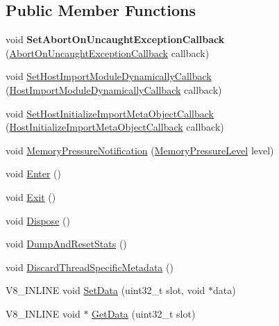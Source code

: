 \subsection*{Public Member Functions}
\begin{DoxyCompactItemize}
\item 
\mbox{\label{classv8_1_1Isolate_afb7aad57eec61464b5a7c3816bae60be}} 
void {\bfseries Set\+Abort\+On\+Uncaught\+Exception\+Callback} (\mbox{\hyperlink{classv8_1_1Isolate_aeb1d49e500d9521b42743a6a740271e2}{Abort\+On\+Uncaught\+Exception\+Callback}} callback)
\item 
void \mbox{\hyperlink{classv8_1_1Isolate_a64a3cec46b3d6a8f437da81ae1a61f84}{Set\+Host\+Import\+Module\+Dynamically\+Callback}} (\mbox{\hyperlink{namespacev8_a327d89ea1fb89b4ada3571a3571413cc}{Host\+Import\+Module\+Dynamically\+Callback}} callback)
\item 
void \mbox{\hyperlink{classv8_1_1Isolate_ad5525cb1e8d0722df9cf1d163204c765}{Set\+Host\+Initialize\+Import\+Meta\+Object\+Callback}} (\mbox{\hyperlink{namespacev8_a46fe0379312fafd495b9be892b2de443}{Host\+Initialize\+Import\+Meta\+Object\+Callback}} callback)
\item 
void \mbox{\hyperlink{classv8_1_1Isolate_ae1b8d5696ba55dd3412989811c44c373}{Memory\+Pressure\+Notification}} (\mbox{\hyperlink{namespacev8_ae0e9a25bf51e518585f555806e7dc7b9}{Memory\+Pressure\+Level}} level)
\item 
void \mbox{\hyperlink{classv8_1_1Isolate_aec80bb49b6b7647ff75e8f2cc9484ea3}{Enter}} ()
\item 
void \mbox{\hyperlink{classv8_1_1Isolate_a64a8503cafd00d1d2cadfbb0c2345054}{Exit}} ()
\item 
void \mbox{\hyperlink{classv8_1_1Isolate_a1a5a5762e4221aff8c6b10f9e3cec0af}{Dispose}} ()
\item 
void \mbox{\hyperlink{classv8_1_1Isolate_a64546846b6d7f33f464ffd2006d88b93}{Dump\+And\+Reset\+Stats}} ()
\item 
void \mbox{\hyperlink{classv8_1_1Isolate_ac62ff53be40f5ecd74fc9e72451da115}{Discard\+Thread\+Specific\+Metadata}} ()
\item 
V8\+\_\+\+I\+N\+L\+I\+NE void \mbox{\hyperlink{classv8_1_1Isolate_a2ae968a7ff8a397f1ac09d32990883f6}{Set\+Data}} (uint32\+\_\+t slot, void $\ast$data)
\item 
V8\+\_\+\+I\+N\+L\+I\+NE void $\ast$ \mbox{\hyperlink{classv8_1_1Isolate_aed85b3c82bf69a60ecebc2558ab95083}{Get\+Data}} (uint32\+\_\+t slot)
\item 

\end{DoxyCompactItemize}
